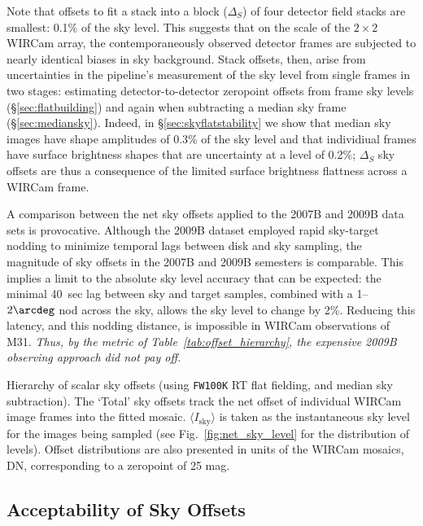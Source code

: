 \documentclass[iop]{emulateapj}
\newcommand{\Fig}[1]{Fig.~\ref{fig:#1}}  %
\newcommand{\Tab}[1]{Table~\ref{tab:#1}}  %
\newcommand{\Sec}[1]{\S\ref{sec:#1}}  %
\begin{document}
Note that offsets to fit a stack into a block ($\Delta_S$) of four detector field stacks are smallest: 0.1\% of the sky level.
This suggests that on the scale of the $2\times 2$ WIRCam array, the contemporaneously observed detector frames are subjected to nearly identical biases in sky background.
Stack offsets, then, arise from uncertainties in the pipeline's measurement of the sky level from single frames in two stages: estimating detector-to-detector zeropoint offsets from frame sky levels (\Sec{flatbuilding}) and again when subtracting a median sky frame (\Sec{mediansky}).
Indeed, in \Sec{skyflatstability} we show that median sky images have shape amplitudes of 0.3\% of the sky level and that individiual frames have surface brightness shapes that are uncertainty at a level of 0.2\%; $\Delta_S$ sky offsets are thus a consequence of the limited surface brightness flattness across a WIRCam frame.

A comparison between the net sky offsets applied to the 2007B and 2009B data sets is provocative.
Although the 2009B dataset employed rapid sky-target nodding to minimize temporal lags between disk and sky sampling, the magnitude of sky offsets in the 2007B and 2009B semesters is comparable.
This implies a limit to the absolute sky level accuracy that can be expected: the minimal 40~sec lag between sky and target samples, combined with a 1--$2\arcdeg$ nod across the sky, allows the sky level to change by 2\%.
Reducing this latency, and this nodding distance, is impossible in WIRCam observations of M31.
\emph{Thus, by the metric of \Tab{offset_hierarchy}, the expensive 2009B observing approach did not pay off.}


\begin{table}[t]
\centering
\caption[Hierarchy of scalar sky offsets]{Hierarchy of scalar sky offsets (using \texttt{FW100K} RT flat fielding, and median sky subtraction).
The `Total' sky offsets track the net offset of individual WIRCam image frames into the fitted mosaic.
$\langle I_\mathrm{sky}\rangle$ is taken as the instantaneous sky level for the images being sampled (see \Fig{net_sky_level} for the distribution of levels).
Offset distributions are also presented in units of the WIRCam mosaics, DN, corresponding to a zeropoint of 25 mag.}
\label{tab:offset_hierarchy}

\end{table}

\subsection{Acceptability of Sky Offsets}
\label{sec:offset_acceptability}
\end{document}
